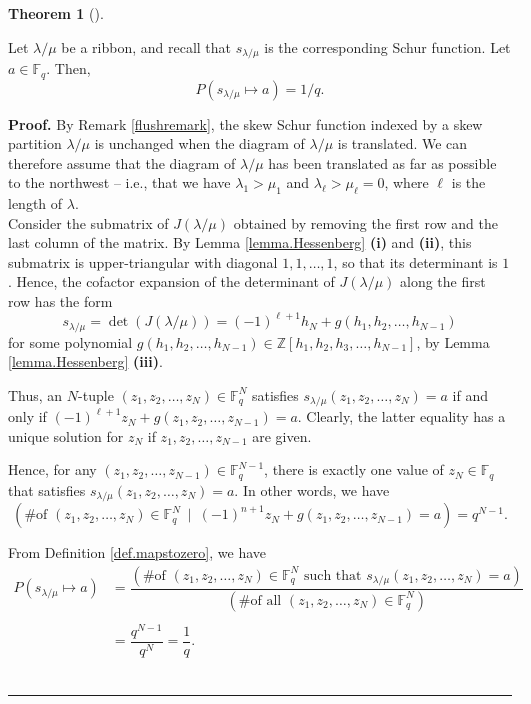 \documentclass[numbers=enddot,12pt,final,onecolumn,notitlepage]{scrartcl}%
\theoremstyle{definition}
\newtheorem{theo}{Theorem}[section]
\newenvironment{theorem}[1][]
{\begin{theo}[#1]\begin{leftbar}}
{\end{leftbar}\end{theo}}
\newenvironment{proof}[1][Proof]{\noindent\textbf{#1.} }{\ \rule{0.5em}{0.5em}}
\newcommand{\tup}[1]{\left( #1 \right)}
\newcommand{\Fq}{\mathbb{F}_q}
\theoremstyle{plainsl}
\begin{document}


\begin{theorem}
\label{thm.ribbon}
Let $\lambda/\mu$ be a ribbon, and recall that $s_{\lambda/\mu}$ is the corresponding Schur function.
Let $a\in \mathbb{F}_{q}$.
Then,
\[
P(s_{\lambda/\mu} \longmapsto a) = 1/q.
\]
\end{theorem}

\begin{proof}
By Remark \ref{flushremark}, the skew Schur function indexed by a skew partition $\lambda / \mu$ is unchanged when the diagram of $\lambda / \mu$ is translated. We can therefore assume that the diagram of $\lambda / \mu$ has been translated as far as possible to the northwest -- i.e., that we have $\lambda_1> \mu_1$ and $\lambda_\ell > \mu_\ell =0$, where $\ell$ is the length of $\lambda$.\\

Consider the submatrix of $J(\lambda/\mu)$ obtained by removing the first row and the last column of the matrix.
By Lemma \ref{lemma.Hessenberg} \textbf{(i)} and \textbf{(ii)}, this submatrix is upper-triangular with diagonal $1, 1, \ldots, 1$, so that its determinant is $1$.
Hence, the cofactor expansion of the determinant of $J(\lambda/\mu)$ along the first row has the form
\[
 s_{\lambda / \mu } = \det(J(\lambda/\mu))= (-1)^{\ell+1} h_N + g( h_1, h_2, \ldots,h_{N-1})
\]
for some polynomial $g( h_1, h_2, \ldots,h_{N-1}) \in \mathbb{Z}\left[  h_{1},h_{2},h_{3},\ldots, h_{N-1}\right]$,
by Lemma \ref{lemma.Hessenberg} \textbf{(iii)}.

Thus, an $N$-tuple $\tup{z_1, z_2, \ldots, z_N} \in \Fq^N$
satisfies
$s_{\lambda / \mu } \tup{z_1, z_2, \ldots, z_{N}} = a$ if
and only if
$(-1)^{\ell+1} z_N + g( z_1, z_2, \ldots,z_{N-1}) = a$.
Clearly, the latter equality has a unique solution for $z_N$
if $z_1, z_2, \ldots, z_{N-1}$ are given.

Hence, for any $\tup{z_1, z_2, \ldots, z_{N-1}} \in \Fq^{N-1}$, there is
exactly one value of $z_N \in \Fq$ that satisfies
$s_{\lambda / \mu } \tup{z_1, z_2, \ldots, z_{N}} = a$.
In other words, we have
\[
\left(  \text{\# of }\left(  z_{1},z_{2},\ldots,z_{N}\right)  \in\mathbb{F}_{q}^{N}
\ \mid\ (-1)^{n+1} z_N + g( z_1, z_2, \ldots,z_{N-1}) =a\right)
= q^{N-1}.
\]

From Definition \ref{def.mapstozero}, we have
\begin{align*}
P\left(  s_{\lambda / \mu }\mapsto a\right)
&=\dfrac{\left(  \text{\# of }\left(  z_{1}%
,z_{2},\ldots,z_{N}\right)  \in\mathbb{F}_{q}^{N}\text{ such that } s_{\lambda / \mu } \left(
z_{1},z_{2},\ldots,z_{N}\right)  =a\right)  }{\left(  \text{\# of all }\left(
z_{1},z_{2},\ldots,z_{N}\right)  \in\mathbb{F}_{q}^{N}\right)  }\\
\\
&=\dfrac{q^{N-1}}{q^N} =\dfrac{1}{q} .
\end{align*}
\end{proof}





\printbibliography
\end{document}
